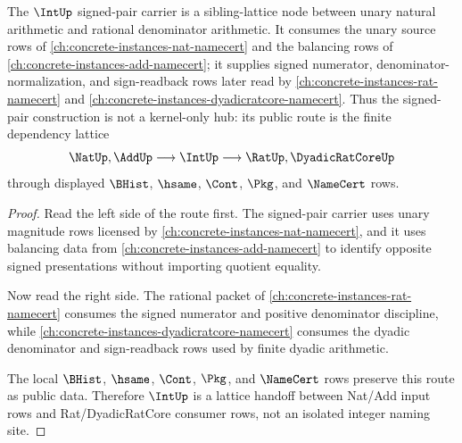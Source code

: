 \begin{theorem}
\label{thm:int-sibling-lattice-orphan-repair}
The $\IntUp$ signed-pair carrier is a sibling-lattice node between unary natural arithmetic and rational denominator arithmetic. It consumes the unary source rows of \autoref{ch:concrete-instances-nat-namecert} and the balancing rows of \autoref{ch:concrete-instances-add-namecert}; it supplies signed numerator, denominator-normalization, and sign-readback rows later read by \autoref{ch:concrete-instances-rat-namecert} and \autoref{ch:concrete-instances-dyadicratcore-namecert}. Thus the signed-pair construction is not a kernel-only hub: its public route is the finite dependency lattice
$$
\NatUp,\AddUp \longrightarrow \IntUp \longrightarrow \RatUp,\DyadicRatCoreUp
$$
through displayed $\BHist$, $\hsame$, $\Cont$, $\Pkg$, and $\NameCert$ rows.
\end{theorem}
\begin{proof}
Read the left side of the route first. The signed-pair carrier uses unary magnitude rows licensed by \autoref{ch:concrete-instances-nat-namecert}, and it uses balancing data from \autoref{ch:concrete-instances-add-namecert} to identify opposite signed presentations without importing quotient equality.

Now read the right side. The rational packet of \autoref{ch:concrete-instances-rat-namecert} consumes the signed numerator and positive denominator discipline, while \autoref{ch:concrete-instances-dyadicratcore-namecert} consumes the dyadic denominator and sign-readback rows used by finite dyadic arithmetic.

The local $\BHist$, $\hsame$, $\Cont$, $\Pkg$, and $\NameCert$ rows preserve this route as public data. Therefore $\IntUp$ is a lattice handoff between Nat/Add input rows and Rat/DyadicRatCore consumer rows, not an isolated integer naming site.
\end{proof}
